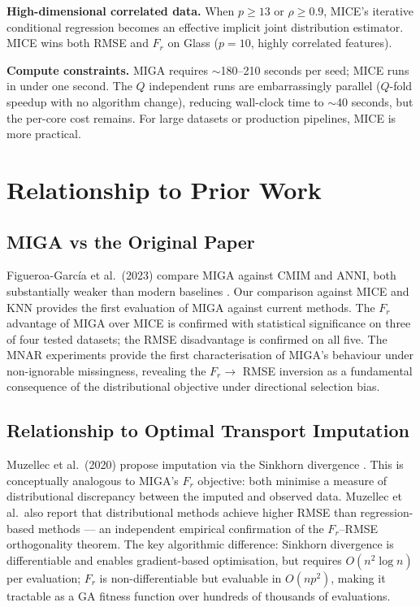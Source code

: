 \textbf{High-dimensional correlated data.} When $p \geq 13$ or $\rho \geq 0.9$, MICE's iterative conditional regression becomes an effective implicit joint distribution estimator. MICE wins both RMSE and $F_r$ on Glass ($p=10$, highly correlated features).

\textbf{Compute constraints.} MIGA requires $\sim$180--210 seconds per seed; MICE runs in under one second. The $Q$ independent runs are embarrassingly parallel ($Q$-fold speedup with no algorithm change), reducing wall-clock time to $\sim$40 seconds, but the per-core cost remains. For large datasets or production pipelines, MICE is more practical.

\section{Relationship to Prior Work}

\subsection{MIGA vs the Original Paper}

Figueroa-Garc\'ia et al.\ (2023) compare MIGA against CMIM and ANNI, both substantially weaker than modern baselines \cite{FigueroaGarcia2023}. Our comparison against MICE and KNN provides the first evaluation of MIGA against current methods. The $F_r$ advantage of MIGA over MICE is confirmed with statistical significance on three of four tested datasets; the RMSE disadvantage is confirmed on all five. The MNAR experiments provide the first characterisation of MIGA's behaviour under non-ignorable missingness, revealing the $F_r \to$ RMSE inversion as a fundamental consequence of the distributional objective under directional selection bias.

\subsection{Relationship to Optimal Transport Imputation}

Muzellec et al.\ (2020) propose imputation via the Sinkhorn divergence \cite{Muzellec2020}. This is conceptually analogous to MIGA's $F_r$ objective: both minimise a measure of distributional discrepancy between the imputed and observed data. Muzellec et al.\ also report that distributional methods achieve higher RMSE than regression-based methods --- an independent empirical confirmation of the $F_r$--RMSE orthogonality theorem. The key algorithmic difference: Sinkhorn divergence is differentiable and enables gradient-based optimisation, but requires $O(n^2 \log n)$ per evaluation; $F_r$ is non-differentiable but evaluable in $O(np^2)$, making it tractable as a GA fitness function over hundreds of thousands of evaluations.

